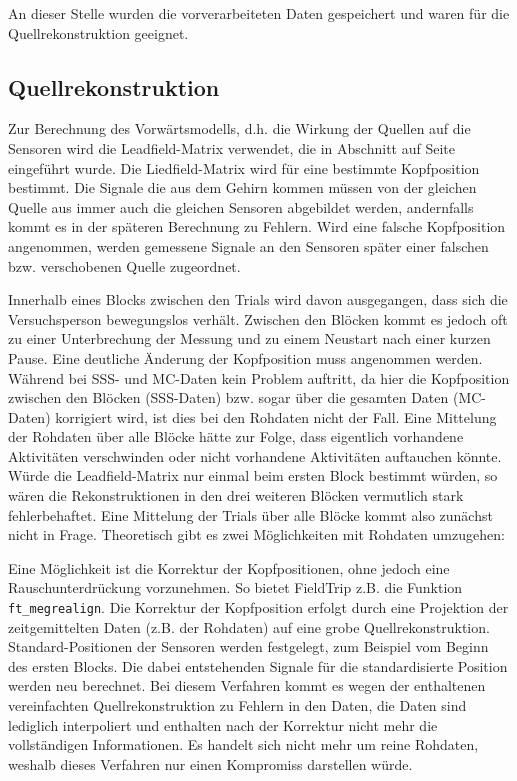 \documentclass[doc,a4paper,12pt]{apa6}
\makeatletter
\DeclareRobustCommand*{\nameref}[1]{%
      \glqq{\myorg@nameref{#1}}\grqq%
    }%
\makeatother
\begin{document}
An dieser Stelle wurden die vorverarbeiteten Daten gespeichert und waren für die Quellrekonstruktion geeignet.

\subsection{Quellrekonstruktion}
\label{sec:lead-beam-mne}

Zur Berechnung des Vorwärtsmodells, d.h. die Wirkung der Quellen auf die Sensoren wird die Leadfield-Matrix verwendet, die in Abschnitt \nameref{sec:lead} auf Seite \pageref{sec:lead} eingeführt wurde. Die Liedfield-Matrix wird für eine bestimmte Kopfposition bestimmt. Die Signale die aus dem Gehirn kommen müssen von der gleichen Quelle aus immer auch die gleichen Sensoren abgebildet werden, andernfalls kommt es in der späteren Berechnung zu Fehlern. Wird eine falsche Kopfposition angenommen, werden gemessene Signale an den Sensoren später einer falschen bzw. verschobenen Quelle zugeordnet.

Innerhalb eines Blocks zwischen den Trials wird davon ausgegangen, dass sich die Versuchsperson bewegungslos verhält. Zwischen den Blöcken kommt es jedoch oft zu einer Unterbrechung der Messung und zu einem Neustart nach einer kurzen Pause. Eine deutliche Änderung der Kopfposition muss angenommen werden. Während bei SSS- und MC-Daten kein Problem auftritt, da hier die Kopfposition zwischen den Blöcken (SSS-Daten) bzw. sogar über die gesamten Daten (MC-Daten) korrigiert wird, ist dies bei den Rohdaten nicht der Fall. Eine Mittelung der Rohdaten über alle Blöcke hätte zur Folge, dass eigentlich vorhandene Aktivitäten verschwinden oder nicht vorhandene Aktivitäten auftauchen könnte. Würde die Leadfield-Matrix nur einmal beim ersten Block bestimmt würden, so wären die Rekonstruktionen in den drei weiteren Blöcken vermutlich stark fehlerbehaftet. Eine Mittelung der Trials über alle Blöcke kommt also zunächst nicht in Frage. Theoretisch gibt es zwei Möglichkeiten mit Rohdaten umzugehen:

Eine Möglichkeit ist die Korrektur der Kopfpositionen, ohne jedoch eine Rauschunterdrückung vorzunehmen. So bietet FieldTrip z.B. die Funktion \texttt{ft\_megrealign}. Die Korrektur der Kopfposition erfolgt durch eine Projektion der zeitgemittelten Daten (z.B. der Rohdaten) auf eine grobe Quellrekonstruktion. Standard-Positionen der Sensoren werden festgelegt, zum Beispiel vom Beginn des ersten Blocks. Die dabei entstehenden Signale für die standardisierte Position werden neu berechnet. Bei diesem Verfahren kommt es wegen der enthaltenen vereinfachten Quellrekonstruktion zu Fehlern in den Daten, die Daten sind lediglich interpoliert und enthalten nach der Korrektur nicht mehr die vollständigen Informationen. Es handelt sich nicht mehr um reine Rohdaten, weshalb dieses Verfahren nur einen Kompromiss darstellen würde.
\end{document}

